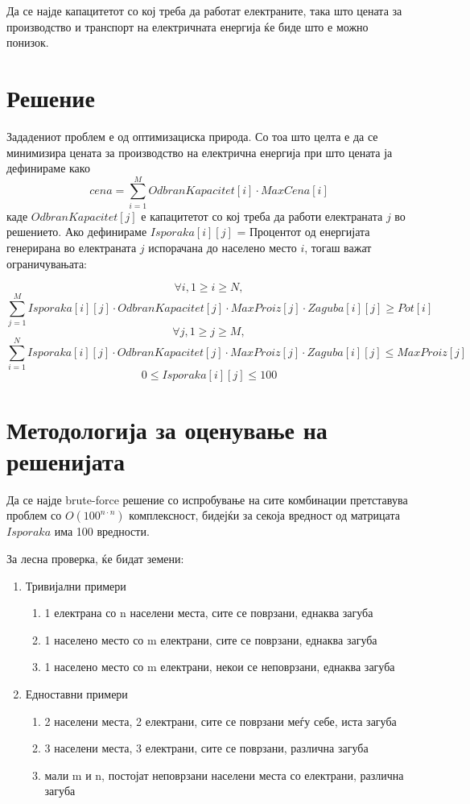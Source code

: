 \documentclass{article}
\begin{document}
Да се најде капацитетот со кој треба да работат електраните, така што цената за производство и транспорт на електричната енергија ќе биде што е можно понизок.

\section{Решение}

Зададениот проблем е од оптимизациска природа. Со тоа што целта е да се минимизира цената за производство на електрична енергија при што цената ја дефинираме како
\[cena = \sum_{i=1}^{M}OdbranKapacitet[i]\cdot MaxCena[i]\]
каде $OdbranKapacitet[j]$ е капацитетот со кој треба да работи електраната $j$ во решението. Ако дефинираме $Isporaka[i][j]$ = Процентот од енергијата генерирана во електраната $j$ испорачана до населено место $i$, тогаш важат ограничувањата:

\[\forall i, 1 \geq i \geq N,\]
\[\sum_{j=1}^{M} Isporaka[i][j] \cdot OdbranKapacitet[j] \cdot MaxProiz[j] \cdot Zaguba[i][j] \geq Pot[i]\]
\[\forall j, 1\geq j \geq M,\]
\[\sum_{i=1}^{N} Isporaka[i][j] \cdot OdbranKapacitet[j] \cdot MaxProiz[j] \cdot Zaguba[i][j] \leq MaxProiz[j] \]
\[ 0 \leq Isporaka[i][j] \leq 100 \]

\section{Методологија за оценување на решенијата}
Да се најде brute-force решение со испробување на сите комбинации претставува проблем со $O(100^{n \cdot n})$  комплексност, бидејќи за секоја вредност од матрицата $Isporaka$ има 100 вредности. 

За лесна проверка, ќе бидат земени:
\begin{enumerate}
\item Тривијални примери
	\begin{enumerate}
	\item 1 електрана со n населени места, сите се поврзани, еднаква загуба
	\item 1 населено место со m електрани, сите се поврзани, еднаква загуба
	\item 1 населено место со m електрани, некои се неповрзани, еднаква загуба
	\end{enumerate} 
\item Едноставни примери
	\begin{enumerate}
	\item 2 населени места, 2 електрани, сите се поврзани меѓу себе, иста загуба
	\item 3 населени места, 3 електрани, сите се поврзани, различна загуба
	\item мали m и n, постојат неповрзани населени места со електрани, различна загуба
	\end{enumerate}
\end{enumerate}
\end{document}
